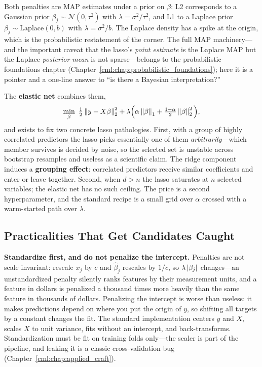 Both penalties are MAP estimates under a prior on $\beta$: L2 corresponds to a Gaussian prior $\beta_j \sim \mathcal{N}(0, \tau^2)$ with $\lambda = \sigma^2/\tau^2$, and L1 to a Laplace prior $\beta_j \sim \mathrm{Laplace}(0,b)$ with $\lambda = \sigma^2/b$. The Laplace density has a spike at the origin, which is the probabilistic restatement of the corner. The full MAP machinery---and the important caveat that the lasso's \emph{point estimate} is the Laplace MAP but the Laplace \emph{posterior mean} is not sparse---belongs to the probabilistic-foundations chapter (Chapter~\ref{cml:chap:probabilistic_foundations}); here it is a pointer and a one-line answer to ``is there a Bayesian interpretation?''

The \textbf{elastic net} combines them,
\begin{equation}
\min_\beta \ \tfrac{1}{2}\left\lVert y-X\beta\right\rVert_2^2 + \lambda\Big(\alpha\left\lVert\beta\right\rVert_1 + \tfrac{1-\alpha}{2}\left\lVert\beta\right\rVert_2^2\Big),
\end{equation}
and exists to fix two concrete lasso pathologies. First, with a group of highly correlated predictors the lasso picks essentially one of them \emph{arbitrarily}---which member survives is decided by noise, so the selected set is unstable across bootstrap resamples and useless as a scientific claim. The ridge component induces a \textbf{grouping effect}: correlated predictors receive similar coefficients and enter or leave together. Second, when $d > n$ the lasso saturates at $n$ selected variables; the elastic net has no such ceiling. The price is a second hyperparameter, and the standard recipe is a small grid over $\alpha$ crossed with a warm-started path over $\lambda$.

\subsection{Practicalities That Get Candidates Caught}

\begin{warningbox}
\textbf{Standardize first, and do not penalize the intercept.} Penalties are not scale invariant: rescale $x_j$ by $c$ and $\hat\beta_j$ rescales by $1/c$, so $\lambda\left|\beta_j\right|$ changes---an unstandardized penalty silently ranks features by their measurement units, and a feature in dollars is penalized a thousand times more heavily than the same feature in thousands of dollars. Penalizing the intercept is worse than useless: it makes predictions depend on where you put the origin of $y$, so shifting all targets by a constant changes the fit. The standard implementation centers $y$ and $X$, scales $X$ to unit variance, fits without an intercept, and back-transforms. Standardization must be fit on training folds only---the scaler is part of the pipeline, and leaking it is a classic cross-validation bug (Chapter~\ref{cml:chap:applied_craft}).
\end{warningbox}

